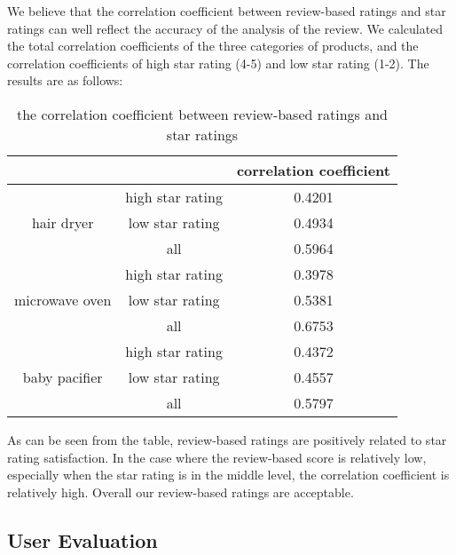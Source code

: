 \documentclass{mcmthesis}
\begin{document}
	We believe that the correlation coefficient between review-based ratings and star ratings can well reflect the accuracy of the analysis of the review. We calculated the total correlation coefficients of the three categories of products, and the correlation coefficients of high star rating (4-5) and low star rating (1-2). The results are as follows:
	
	
	
	\begin{table}[h]
		\begin{center} 
			\caption{the correlation coefficient between review-based ratings and star ratings}
			\begin{tabular}{|c|c|c|}
				\hline
				&                  & correlation coefficient \\ \hline
				\multirow{3}{*}{hair dryer}     & high star rating & 0.4201                  \\ \cline{2-3} 
				& low star rating  & 0.4934                  \\ \cline{2-3} 
				& all              & 0.5964                  \\ \hline
				\multirow{3}{*}{microwave oven} & high star rating & 0.3978                  \\ \cline{2-3} 
				& low star rating  & 0.5381                  \\ \cline{2-3} 
				& all              & 0.6753                  \\ \hline
				\multirow{3}{*}{baby pacifier}  & high star rating & 0.4372                  \\ \cline{2-3} 
				& low star rating  & 0.4557                  \\ \cline{2-3} 
				& all              & 0.5797                  \\ \hline
			\end{tabular}
		\end{center}
	\end{table}
	
	
	As can be seen from the table, review-based ratings are positively related to star rating satisfaction. In the case where the review-based score is relatively low, especially when the star rating is in the middle level, the correlation coefficient is relatively high. Overall our review-based ratings are acceptable.
	
	
	\subsection{User Evaluation}
\end{document}
